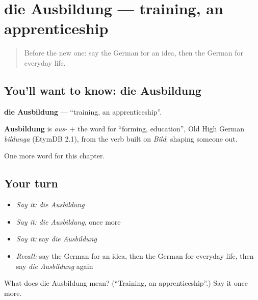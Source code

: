 \section[die Ausbildung]{die Ausbildung — training, an apprenticeship}

\label{lesson:GE-C225-ausbildung}



\begin{quote}
Before the new one: say the German for an idea, then the German for everyday life.
\end{quote}

\subsection*{You'll want to know: die Ausbildung}
\textbf{die Ausbildung} — \textquotedblleft{}training, an apprenticeship\textquotedblright{}.

\begin{cousinweb}
\textbf{Ausbildung} is \emph{aus-} + the word for \textquotedblleft{}forming, education\textquotedblright{}, Old High German \emph{bildunga} (EtymDB 2.1), from the verb built on \emph{Bild}: shaping someone out.
\end{cousinweb}

\begin{grammarlens}[title={What you've built}]
One more word for this chapter.
\end{grammarlens}

\subsection*{Your turn}
\begin{itemize}
\raggedright
  \item \emph{Say it:} \emph{die Ausbildung}
  \item \emph{Say it:} \emph{die Ausbildung}, once more
  \item \emph{Say it:} say \emph{die Ausbildung}
  \item \emph{Recall:} say the German for an idea, then the German for everyday life, then say \emph{die Ausbildung} again
\end{itemize}

\begin{tcolorbox}[breakable,colback=teal!4,colframe=teal!35!black,title={Before you move on}]
What does die Ausbildung mean? (\textquotedblleft{}Training, an apprenticeship\textquotedblright{}.) Say it once more.
\end{tcolorbox}
